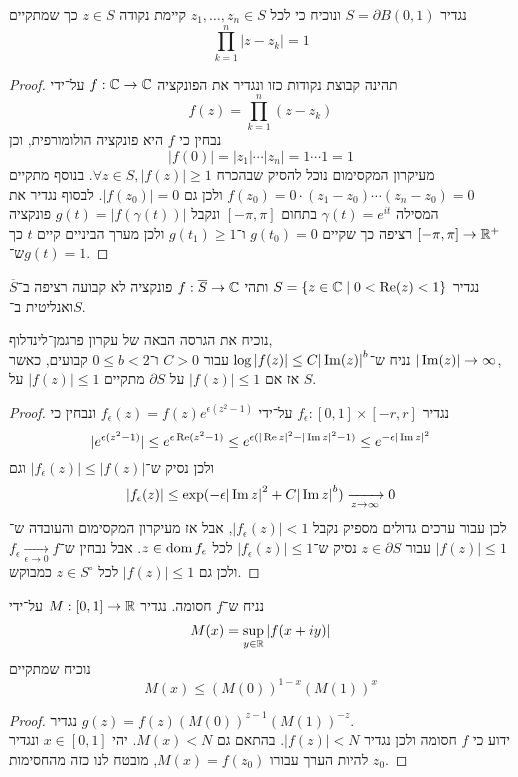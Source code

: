 \question{}
נגדיר $S = \partial B(0, 1)$ ונוכיח כי לכל $z_1, \dots, z_n \in S$ קיימת נקודה $z \in S$ כך שמתקיים
\[
	\prod_{k = 1}^n |z - z_k| = 1
\]
\begin{proof}
	תהינה קבוצת נקודות כזו ונגדיר את הפונקציה $f : \mathbb{C} \to \mathbb{C}$ על־ידי
	\[
		f(z) = \prod_{k = 1}^n (z - z_k)
	\]
	נבחין כי $f$ היא פונקציה הולומורפית, וכן
	\[
		|f(0)| = |z_1| \cdots |z_n| = 1 \cdots 1 = 1
	\]
	מעיקרון המקסימום נוכל להסיק שבהכרח $\forall z \in S, |f(z)| \ge 1$.
	בנוסף מתקיים $f(z_0) = 0 \cdot (z_1 - z_0) \cdots (z_n - z_0) = 0$ ולכן גם $|f(z_0)| = 0$.
	לבסוף נגדיר את המסילה $\gamma(t) = e^{it}$ בתחום $[-\pi, \pi]$ ונקבל $g(t) = |f(\gamma(t))|$ פונקציה $[-\pi, \pi] \to \mathbb{R}^+$ רציפה כך שקיים $g(t_0) = 0$ ו־$g(t_1) \ge 1$ ולכן מערך הביניים קיים $t$ כך ש־$g(t) = 1$.
\end{proof}

\question{}
נגדיר $S = \{ z \in \mathbb{C} \mid 0 < \operatorname{Re}(z) < 1\}$ ותהי $f : \overline{S} \to \mathbb{C}$ פונקציה לא קבועה רציפה ב־$\overline{S}$ ואנליטית ב־$S$.

\subquestion{}
נוכיח את הגרסה הבאה של עקרון פרגמן־לינדלוף, \\
נניח ש־$\log |f(z)| \le C {|\operatorname{Im}(z)|}^b$ עבור $C > 0$ ו־$0 \le b < 2$ קבועים, כאשר $|\operatorname{Im}(z)| \to \infty$, \\
אז אם $|f(z)| \le 1$ על $\partial S$ מתקיים $|f(z)| \le 1$ על $S$.
\begin{proof}
	נגדיר $f_\epsilon : [0, 1] \times [-r, r]$ על־ידי $f_\epsilon(z) = f(z) e^{\epsilon (z^2 - 1)}$ ונבחין כי
	\[
		|e^{\epsilon (z^2 - 1)}|
		\le e^{\epsilon \operatorname{Re}(z^2 - 1)}
		\le e^{\epsilon({|\operatorname{Re} z|}^2 - {|\operatorname{Im} z|}^2 - 1)}
		\le e^{-\epsilon {|\operatorname{Im}z|}^2}
	\]
	ולכן נסיק ש־$|f_\epsilon(z)| \le |f(z)|$ וגם
	\[
		|f_\epsilon(z)|
		\le \exp(-\epsilon {|\operatorname{Im}z|}^2 + C {|\operatorname{Im} z|}^b)
		\xrightarrow[z \to \infty]{} 0
	\]
	לכן עבור ערכים גדולים מספיק נקבל $|f_\epsilon(z)| < 1$, אבל אז מעיקרון המקסימום והעובדה ש־$|f(z)| \le 1$ עבור $z \in \partial S$ נסיק ש־$|f_\epsilon(z)| \le 1$ לכל $z \in \operatorname{dom} f_\epsilon$.
	אבל נבחין ש־$f_\epsilon \xrightarrow[\epsilon \to 0]{} f$ ולכן גם $|f(z)| \le 1$ לכל $z \in S^\circ$ כמבוקש.
\end{proof}

\subquestion{}
נניח ש־$f$ חסומה.
נגדיר $M : [0, 1] \to \mathbb{R}$ על־ידי
\[
	M(x) = \sup_{y \in \mathbb{R}} |f(x + iy)|
\]
נוכיח שמתקיים
\[
	M(x) \le {(M(0))}^{1 - x} {(M(1))}^x
\]
\begin{proof}
	נגדיר $g(z) = f(z) {(M(0))}^{z - 1} {(M(1))}^{-z}$. \\
	ידוע כי $f$ חסומה ולכן נגדיר $|f(z)| < N$.
	בהתאם גם $M(x) < N$.
	יהי $x \in [0, 1]$ ונגדיר $z_0$ להיות הערך עבורו $M(x) = f(z_0)$, מובטח לנו כזה מהחסימות.
\end{proof}

